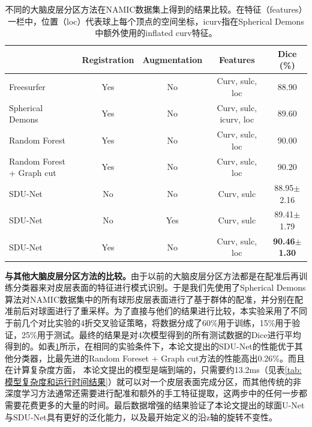 \begin{table}[t]
		\caption{不同的大脑皮层分区方法在NAMIC数据集上得到的结果比较。在特征（features）一栏中，位置（loc）代表球上每个顶点的空间坐标，icurv指在Spherical Demons中额外使用的inflated curv特征。}
		\label{tab:与其他脑皮层分区方法比较}
		\centering
		\begin{tabularx}{\linewidth}{l|c|c|c|c}
			\hline
			& Registration & Augmentation & Features &  Dice (\%) \\
			\hline
			Freesurfer \cite{desikan2006automated}         & Yes  & No   & Curv, sulc, loc                & 88.90 \\
			Spherical Demons \cite{yeo2009spherical}   & Yes  & No   & Curv, sulc, icurv, loc & 89.60  \\
			Random Forest \cite{meng2015automatic}      & Yes  & No   & Curv, sulc, loc                & 90.00  \\
			Random Forest + Graph cut \cite{meng2015automatic} & Yes & No & Curv, sulc, loc & 90.20 \\
			SDU-Net	 & No & No & Curv, sulc & 88.95$\pm$2.16 \\
			SDU-Net  & No & Yes & Curv, sulc & 89.41$\pm$1.79 \\
			SDU-Net	 & Yes & No & Curv, sulc, loc & \textbf{90.46$\pm$1.30} \\
			\hline 
		\end{tabularx}
\end{table}

\textbf{与其他大脑皮层分区方法的比较。}由于以前的大脑皮层分区方法\cite{yeo2009spherical,meng2015automatic,desikan2006automated}都是在配准后再训练分类器来对皮层表面的特征进行模式识别。于是我们先使用了Spherical Demons算法\cite{yeo2009spherical}对NAMIC数据集中的所有球形皮层表面进行了基于群体的配准，并分别在配准前后对球面进行了重采样。为了直接与他们的结果进行比较，本实验采用了不同于前几个对比实验的4折交叉验证策略，将数据分成了60\%用于训练，15\%用于验证，25\%用于测试。最终的结果是对4次模型得到的所有测试数据的Dice进行平均得到的。如表\ref{tab:与其他脑皮层分区方法比较}所示，在相同的实验条件下，本论文提出的SDU-Net的性能优于其他分类器，比最先进的Random Foreset + Graph cut\cite{meng2015automatic}方法的性能高出0.26\%。而且在计算复杂度方面，
本论文提出的模型是端到端的，只需要约13.2ms（见表\ref{tab:模型复杂度和运行时间结果}）就可以对一个皮层表面完成分区，而其他传统的非深度学习方法通常还需要进行配准和额外的手工特征提取，这两步中的任何一步都需要花费更多的大量的时间。最后数据增强的结果验证了本论文提出的球面U-Net与SDU-Net具有更好的泛化能力，以及最开始定义的沿z轴的旋转不变性。



